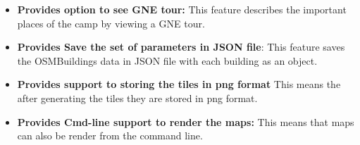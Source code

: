 \begin{itemize}
    \item \textbf{Provides option to see GNE tour:}
    This feature describes the important places of the camp by viewing a GNE tour.
   
    \item \textbf{Provides Save the set of parameters in JSON file}:
    This feature saves the OSMBuildings data in JSON file with each building as an object.
   
    \item \textbf{Provides support to storing the tiles in png format}
    This means the after generating the tiles they are stored in png format.
   
    \item \textbf{Provides Cmd-line support to render the maps:}
    This means that maps can also be render from the command line.
   
     
\end{itemize}

